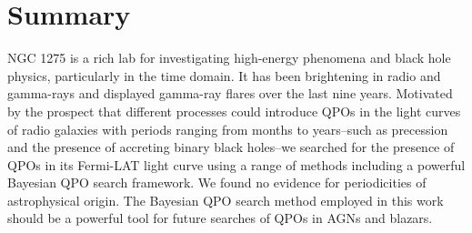 \documentclass{iau}
\begin{document}

\section{Summary}

NGC 1275 is a rich lab for investigating high-energy phenomena and black hole physics, particularly in the time domain. It has been  brightening in radio and gamma-rays and displayed gamma-ray flares over the last nine years. %
Motivated by the prospect that different processes could introduce QPOs in the light curves of radio galaxies with periods ranging from months to years--such as precession and the presence of accreting binary black holes--we searched for the presence of QPOs in its Fermi-LAT light curve using a range of methods including a powerful Bayesian QPO search framework. We found no evidence for periodicities of astrophysical origin. The Bayesian QPO search method employed in this work should be a powerful tool for future searches of QPOs in AGNs and blazars.
\end{document}
